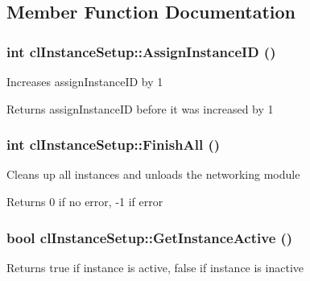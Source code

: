 \subsection{Member Function Documentation}
\hypertarget{classcl_instance_setup_ae958e001782f87e3d4a8588aa46d7423}{
\subsubsection[{AssignInstanceID}]{\setlength{\rightskip}{0pt plus 5cm}int clInstanceSetup::AssignInstanceID ()}}
\label{classcl_instance_setup_ae958e001782f87e3d4a8588aa46d7423}
Increases {\ttfamily assignInstanceID} by 1 \begin{DoxyReturn}{Returns}
{\ttfamily assignInstanceID} before it was increased by 1 
\end{DoxyReturn}
\hypertarget{classcl_instance_setup_a82ee23ff6eb6dd9a070c7c1333383e7f}{
\subsubsection[{FinishAll}]{\setlength{\rightskip}{0pt plus 5cm}int clInstanceSetup::FinishAll ()}}
\label{classcl_instance_setup_a82ee23ff6eb6dd9a070c7c1333383e7f}
Cleans up all instances and unloads the networking module \begin{DoxyReturn}{Returns}
0 if no error, -\/1 if error 
\end{DoxyReturn}
\hypertarget{classcl_instance_setup_a2197f516509bb20a8ed0d7330cc892bb}{
\subsubsection[{GetInstanceActive}]{\setlength{\rightskip}{0pt plus 5cm}bool clInstanceSetup::GetInstanceActive ()}}
\label{classcl_instance_setup_a2197f516509bb20a8ed0d7330cc892bb}
\begin{DoxyReturn}{Returns}
true if instance is active, false if instance is inactive 
\end{DoxyReturn}
